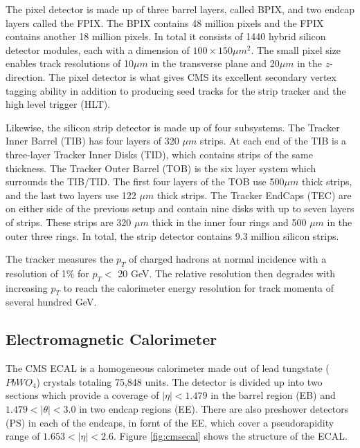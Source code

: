 The pixel detector is made up of three barrel layers, called BPIX, and two endcap layers called the FPIX. The BPIX contains 48 million pixels and the FPIX contains another 18 million pixels. In total it consists of 1440 hybrid silicon detector modules, each with a dimension of $100 \times 150 \mu m^{2}$. The small pixel size enables track resolutions of 10$\mu m$ in the transverse plane and 20$\mu m$ in the $z$-direction. The pixel detector is what gives CMS its excellent secondary vertex tagging ability in addition to producing seed tracks for the strip tracker and the high level trigger (HLT).

Likewise, the silicon strip detector is made up of four subsystems. The Tracker Inner Barrel (TIB) has four layers of 320 $\mu m$ strips. At each end of the TIB is a three-layer Tracker Inner Disks (TID), which contains strips of the same thickness. The Tracker Outer Barrel (TOB) is the six layer system which surrounds the TIB/TID. The first four layers of the TOB use 500$\mu m$ thick strips, and the last two layers use 122 $\mu m$ thick strips. The Tracker EndCaps (TEC) are on either side of the previous setup and contain nine disks with up to seven layers of strips. These strips are 320 $\mu m$ thick in the inner four rings and 500 $\mu m$ in the outer three rings. In total, the strip detector contains 9.3 million silicon strips.

The tracker measures the $p_{T}$ of charged hadrons at normal incidence with a resolution of 1$\%$ for $p_{T}<$ 20 GeV\cite{Sirunyan_2017}. The relative resolution then degrades with increasing $p_{T}$ to reach the calorimeter energy resolution for track momenta of several hundred GeV.

 \subsection{Electromagnetic Calorimeter}

 The CMS ECAL\cite{CERN-LHCC-97-033} is a homogeneous calorimeter made out of lead tungstate ($PbWO_{4}$) crystals totaling 75,848 units. The detector is divided up into two sections which provide a coverage of $|\eta| < 1.479$ in the barrel region (EB) and $1.479 < |\theta| < 3.0$ in two endcap regions (EE). There are also preshower detectors (PS) in each of the endcaps, in fornt of the EE, which cover a pseudorapidity range of $1.653 < |\eta| < 2.6$. Figure \ref{fig:cmsecal} shows the structure of the ECAL.


